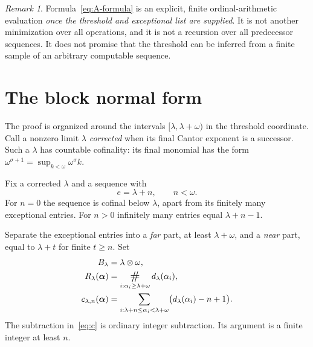 \documentclass[11pt,letterpaper]{article}
\theoremstyle{definition}
\theoremstyle{remark}
\newtheorem{remark}[theorem]{Remark}
\newcommand{\seq}[1]{\boldsymbol{#1}}
\newcommand{\np}{\mathbin{\otimes}}
\newcommand{\NS}{\mathop{\mathchoice{\vcenter{\hbox{\Large\#}}}{\vcenter{\hbox{\large\#}}}{\#}{\#}}}
\newcommand{\diff}[2]{d_{#1}(#2)}
\begin{document}
\begin{remark}
Formula~\eqref{eq:A-formula} is an explicit, finite ordinal-arithmetic evaluation \emph{once the threshold and exceptional list are supplied}. It is not another minimization over all operations, and it is not a recursion over all predecessor sequences. It does not promise that the threshold can be inferred from a finite sample of an arbitrary computable sequence.
\end{remark}

\section{The block normal form}\label{sec:block}

The proof is organized around the intervals $[\lambda,\lambda+\omega)$ in the threshold coordinate. Call a nonzero limit $\lambda$ \emph{corrected} when its final Cantor exponent is a successor. Such a $\lambda$ has countable cofinality: its final monomial has the form $\omega^{\sigma+1}=\sup_{k<\omega}\omega^\sigma k$.

Fix a corrected $\lambda$ and a sequence with
\[
 e=\lambda+n,\qquad n<\omega.
\]
For $n=0$ the sequence is cofinal below $\lambda$, apart from its finitely many exceptional entries. For $n>0$ infinitely many entries equal $\lambda+n-1$.

Separate the exceptional entries into a \emph{far} part, at least $\lambda+\omega$, and a \emph{near} part, equal to $\lambda+t$ for finite $t\ge n$. Set
\begin{align}
 B_\lambda&=\lambda\np\omega,\label{eq:B}\\
 R_\lambda(\seq\alpha)&=\NS_{i:\alpha_i\ge\lambda+\omega}
                       \diff\lambda{\alpha_i},\label{eq:R}\\
 c_{\lambda,n}(\seq\alpha)&=
  \sum_{i:\lambda+n\le\alpha_i<\lambda+\omega}
          \bigl(\diff\lambda{\alpha_i}-n+1\bigr).\label{eq:c}
\end{align}
The subtraction in~\eqref{eq:c} is ordinary integer subtraction. Its argument is a finite integer at least $n$.
\end{document}

